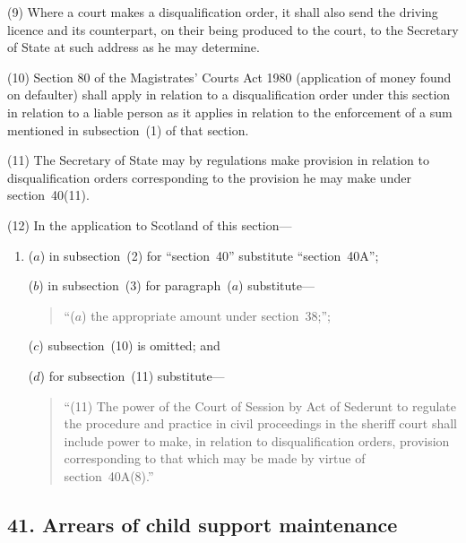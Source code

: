 \documentclass[12pt,a4paper]{article}
\begin{document}
(9) Where a court makes a disqualification order, it shall also send the driving licence and its counterpart, on their being produced to the court, to the Secretary of State at such address as he may determine.

(10) Section 80 of the Magistrates' Courts Act 1980 (application of money found on defaulter) shall apply in relation to a disqualification order under this section in relation to a liable person as it applies in relation to the enforcement of a sum mentioned in subsection~(1)  of that section.

(11) The Secretary of State may by regulations make provision in relation to disqualification orders corresponding to the provision he may make under section~40(11).

(12) In the application to Scotland of this section—
\begin{enumerate}\item[]
\begin{sloppypar}
($a$) in subsection~(2)  for “section~40” substitute “section~40A”;
\end{sloppypar}

($b$) in subsection~(3)  for paragraph~($a$)  substitute—
\begin{quotation}
“($a$) the appropriate amount under section~38;”;
\end{quotation}

($c$) subsection~(10)  is omitted; and

($d$) for subsection~(11)  substitute—
\begin{quotation}
“(11) The power of the Court of Session by Act of Sederunt to regulate the procedure and practice in civil proceedings in the sheriff court shall include power to make, in relation to disqualification orders, provision corresponding to that which may be made by virtue of section~40A(8).”
\end{quotation}
\end{enumerate}


\subsection{41. Arrears of child support maintenance}
\end{document}
